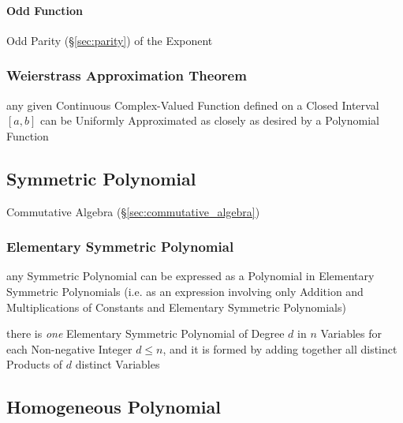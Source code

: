 \paragraph{Odd Function}\label{sec:odd_function}\hfill

Odd Parity (\S\ref{sec:parity}) of the Exponent



\subsubsection{Weierstrass Approximation Theorem}
\label{sec:weierstrass_approximation}

any given Continuous Complex-Valued Function defined on a Closed Interval
$[a,b]$ can be Uniformly Approximated as closely as desired by a Polynomial
Function



\subsection{Symmetric Polynomial}\label{sec:symmetric_polynomial}

\fist Commutative Algebra (\S\ref{sec:commutative_algebra})



\subsubsection{Elementary Symmetric Polynomial}\label{sec:elementary_symmetric}

any Symmetric Polynomial can be expressed as a Polynomial in Elementary
Symmetric Polynomials (i.e. as an expression involving only Addition and
Multiplications of Constants and Elementary Symmetric Polynomials)

there is \emph{one} Elementary Symmetric Polynomial of Degree $d$ in $n$
Variables for each Non-negative Integer $d \leq n$, and it is formed by adding
together all distinct Products of $d$ distinct Variables



\subsection{Homogeneous Polynomial}\label{sec:homogeneous_polynomial}

